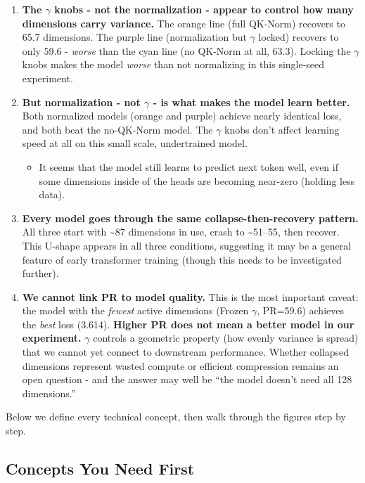 \documentclass[11pt]{article}
\begin{document}
\begin{enumerate}
\item \textbf{The $\gamma$ knobs - not the normalization - appear to control how many dimensions carry variance.} The orange line (full QK-Norm) recovers to 65.7 dimensions. The purple line (normalization but $\gamma$ locked) recovers to only 59.6 - \textit{worse} than the cyan line (no QK-Norm at all, 63.3). Locking the $\gamma$ knobs makes the model \textit{worse} than not normalizing in this single-seed experiment.

\item \textbf{But normalization - not $\gamma$ - is what makes the model learn better.} Both normalized models (orange and purple) achieve nearly identical loss, and both beat the no-QK-Norm model. The $\gamma$ knobs don't affect learning speed at all on this small scale, undertrained model.

\begin{itemize}
\item It seems that the model still learns to predict next token well, even if some dimensions inside of the heads are becoming near-zero (holding less data).
\end{itemize}

\item \textbf{Every model goes through the same collapse-then-recovery pattern.} All three start with \textasciitilde87 dimensions in use, crash to \textasciitilde51--55, then recover. This U-shape appears in all three conditions, suggesting it may be a general feature of early transformer training (though this needs to be investigated further).

\item \textbf{We cannot link PR to model quality.} This is the most important caveat: the model with the \textit{fewest} active dimensions (Frozen $\gamma$, PR=59.6) achieves the \textit{best} loss (3.614). \textbf{Higher PR does not mean a better model in our experiment.} $\gamma$ controls a geometric property (how evenly variance is spread) that we cannot yet connect to downstream performance. Whether collapsed dimensions represent wasted compute or efficient compression remains an open question - and the answer may well be ``the model doesn't need all 128 dimensions.''
\end{enumerate}

Below we define every technical concept, then walk through the figures step by step.

\subsection{Concepts You Need First}
\end{document}
